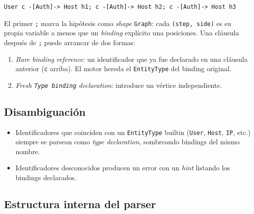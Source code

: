 \begin{lstlisting}
User c -[Auth]-> Host h1; c -[Auth]-> Host h2; c -[Auth]-> Host h3
\end{lstlisting}

\begin{intuicion}
El primer \texttt{;} marca la hipótesis como \emph{shape}
\texttt{Graph}: cada \texttt{(step, side)} es su propia variable a
menos que un \emph{binding} explícito una posiciones. Una cláusula
después de \texttt{;} puede arrancar de dos formas:

\begin{enumerate}
    \item \emph{Bare binding reference}: un identificador que ya fue
    declarado en una cláusula anterior (\texttt{c} arriba). El motor
    hereda el \texttt{EntityType} del binding original.
    \item \emph{Fresh \texttt{Type binding} declaration}: introduce
    un vértice independiente.
\end{enumerate}
\end{intuicion}

\subsection{Disambiguación}

\begin{itemize}
    \item Identificadores que coinciden con un \texttt{EntityType}
    builtin (\texttt{User}, \texttt{Host}, \texttt{IP}, etc.) siempre
    se parsean como \emph{type declaration}, sombreando bindings del
    mismo nombre.
    \item Identificadores desconocidos producen un error con un
    \emph{hint} listando los bindings declarados.
\end{itemize}

\subsection{Estructura interna del parser}

